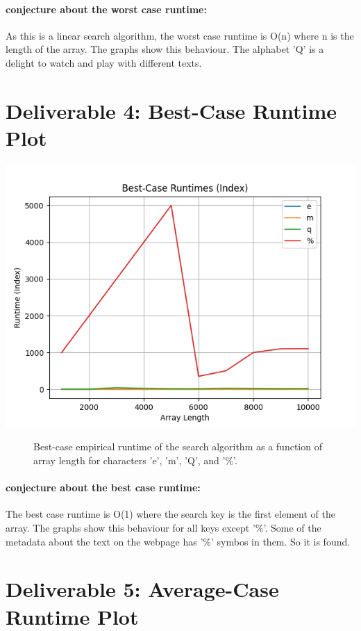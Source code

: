 \documentclass{article}
\begin{document}
\paragraph*{conjecture about the worst case runtime: }
As this is a linear search algorithm,
the worst case runtime is O(n) where n is the length of the array. The graphs show this behaviour. The alphabet 'Q' is a delight to watch and play with different texts. 
\section*{Deliverable 4: Best-Case Runtime Plot}

\includegraphics[width=\textwidth]{best-case_runtimes_(index).png}
\begin{figure}
    \caption{Best-case empirical runtime of the search algorithm as a function of array length for characters 'e', 'm', 'Q', and '\%'.}
\end{figure}

\paragraph*{conjecture about the best case runtime: }
The best case runtime is O(1) where the search key is the first element of the array. The graphs show this behaviour for all keys except '\%'. Some of the metadata about the text on the webpage has '\%' symbos in them. So it is found.
\section*{Deliverable 5: Average-Case Runtime Plot}
\end{document}
